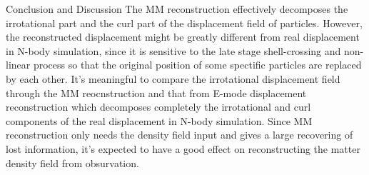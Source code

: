 \begin{section}{Conclusion and Discussion}
   The MM reconstruction effectively decomposes the irrotational part and the curl part of the displacement 
field of particles. However, the reconstructed displacement might be greatly different from real displacement in N-body 
simulation, since it is sensitive to the late stage shell-crossing and non-linear process so that the original 
position of some spectific particles are replaced by each other. It's meaningful to compare the irrotational 
displacement field through the MM reocnstruction and that from E-mode displacement reconstruction \cite{bib:Yu2016} 
which decomposes completely the irrotational and curl components of the real displacement in N-body simulation. 
Since MM reconstruction only needs the density field input and gives a large recovering of lost information, 
it's expected to have a good effect on reconstructing the matter density field from obsurvation.
\end{section}
